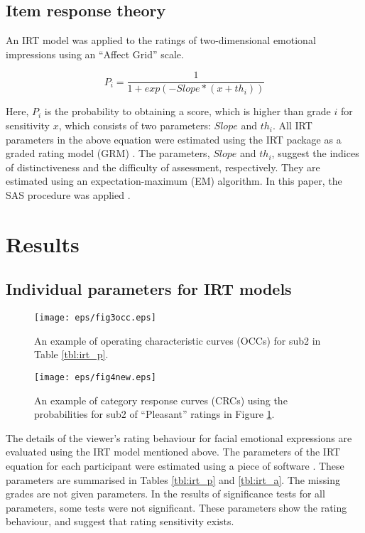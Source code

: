 \documentclass[fonts]{icst}
\begin{document}
\subsection{Item response theory}

An IRT model was applied to the ratings of two-dimensional emotional
impressions using an ``Affect Grid'' scale. 


\[
P_i=\frac{1}{1+exp(-Slope*(x+th_i))}
\]

Here, $P_i$ is the probability to obtaining a score, which is higher than
grade $i$ for sensitivity $x$, which consists of two parameters:
$Slope$ and $th_i$.
All IRT parameters in the above equation were estimated using the 
IRT package as a graded rating model (GRM) \cite{sasirt}.
The parameters, $Slope$ and $th_i$, suggest the indices of distinctiveness
and the difficulty of assessment, respectively.
They are estimated using an expectation-maximum (EM) algorithm. 
In this paper, the SAS procedure was applied \cite{sasirt}.


\section{Results}

\subsection{Individual parameters for IRT models}

\begin{figure}[tb]
   \begin{center}
    \texttt{[image: eps/fig3occ.eps]}
   \end{center}
  \caption{An example of operating characteristic curves (OCCs) for sub2
 in Table \ref{tbl:irt_p}.}
  \label{fig:sub2o}
\end{figure}

\begin{figure}[tb]
   \begin{center}
    \texttt{[image: eps/fig4new.eps]}
   \end{center}
  \caption{An example of category response curves (CRCs) using
 the probabilities for sub2 of ``Pleasant'' ratings in Figure \ref{fig:sub2o}. } 
  \label{fig:sub2c}
\end{figure}

The details of the viewer's rating behaviour for facial emotional
expressions are evaluated using the IRT model mentioned above. 
The parameters of the IRT equation for each participant were estimated 
using a piece of software \cite{sasirt}. 
These parameters are summarised
in Tables \ref{tbl:irt_p} and \ref{tbl:irt_a}. 
The missing grades are not given parameters.
In the results of significance tests for all parameters, some tests were
not significant. These parameters show the rating behaviour, and suggest
that rating sensitivity exists.
\end{document}
